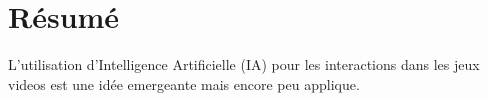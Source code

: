 \pagestyle{plain}
\chapter*{Résumé}
L'utilisation d'Intelligence Artificielle (IA) pour les interactions dans les jeux videos est une idée emergeante mais encore peu applique.


\cite{tucek_one_nodate}
\cite{toprac_automation_nodate}
\cite{yu_gamefactory_2025}
\cite{ratican_video_2024}
\cite{lu_research_nodate}
\cite{chaudhary_deep_2021}
\cite{mao_procedural_2024}
\cite{buongiorno_pangea_2024}
\cite{justesen_human-like_2024}
\cite{macia-lillo_hybrid_2025}
\cite{jeremiah_ratican1_adaptive_2024}
\cite{ayas_artificial_2023}
\cite{li_unbounded_2024}
\cite{kenwright_why_nodate}
\cite{hardiman_ai-powered_2024}
\cite{arai_ais_2024}
\cite{akoury_towards_nodate}
\cite{zeng_review_2023}
\cite{theune_affective_nodate}

\clearpage

